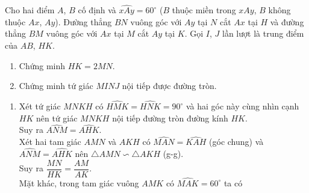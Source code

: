 \begin{bt}%
 Cho hai điểm $A$, $B$ cố định và $\widehat{xAy}=60^\circ$  ($B$ thuộc miền trong $\widehat{xAy}$, $B$ không thuộc $Ax$, $Ay$). Đường thẳng $BN$ vuông góc với $Ay$ tại $N$ cắt $Ax$ tại $H$ và đường thẳng $BM$ vuông góc với $Ax$ tại $M$ cắt $Ay$ tại $K$. Gọi $I$, $J$ lần lượt là trung điểm của $AB$, $HK$.
 \begin{enumerate}
  \item Chứng minh $HK = 2MN$.
  \item Chứng minh tứ giác $MINJ$ nội tiếp được đường tròn.
 \end{enumerate}
 \loigiai
  {
  \begin{enumerate}
   \item
   \immini
   {
   Xét tứ giác $MNKH$ có $\widehat{HMK}=\widehat{HNK}=90^\circ$ và hai góc này cùng nhìn cạnh $HK$ nên tứ giác $MNKH$ nội tiếp đường tròn đường kính $HK$.\\
   Suy ra $\widehat{ANM}=\widehat{AHK}$.\\
   Xét hai tam giác $AMN$ và $AKH$ có $\widehat{MAN}=\widehat{KAH}$ (góc chung) và $\widehat{ANM}=\widehat{AHK}$ nên $\triangle AMN \backsim \triangle AKH$ (g-g).\\
   Suy ra $\dfrac{MN}{HK}=\dfrac{AM}{AK}$.\\
   Mặt khác, trong tam giác vuông $AMK$ có $\widehat{MAK}=60^\circ$ ta có
   
}
\end{enumerate}}
\end{bt}

